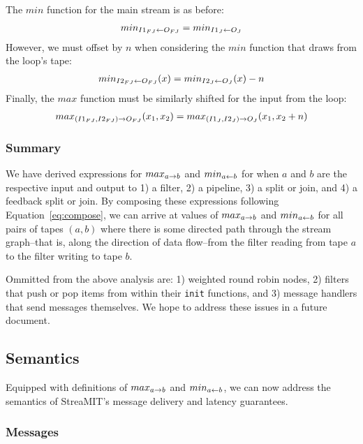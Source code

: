 The $min$ function for the main stream is as before:
\begin{align*}
min_{I1_{FJ} \leftarrow O_{FJ}} = min_{I1_J \leftarrow O_J} 
\end{align*}
However, we must offset by $n$ when considering the $min$ function
that draws from the loop's tape:
\begin{align*}
min_{I2_{FJ} \leftarrow O_{FJ}}(x) = min_{I2_J \leftarrow O_J}(x) - n
\end{align*}
Finally, the $max$ function must be similarly shifted for the input
from the loop:
\begin{align*}
max_{(I1_{FJ}, I2_{FJ}) \rightarrow O_{FJ}}(x_1, x_2) = max_{(I1_J, I2_J) \rightarrow O_J}(x_1,
x_2 + n)
\end{align*}

\subsubsection{Summary}

We have derived expressions for $max_{a \rightarrow b}$ and $min_{a \leftarrow b}$ for when
$a$ and $b$ are the respective input and output to 1) a filter, 2) a
pipeline, 3) a split or join, and 4) a feedback split or join.  By
composing these expressions following Equation~\ref{eq:compose}, we
can arrive at values of $max_{a \rightarrow b}$ and $min_{a \leftarrow b}$ for all pairs of
tapes $(a, b)$ where there is some directed path through the stream
graph--that is, along the direction of data flow--from the filter
reading from tape $a$ to the filter writing to tape $b$.  

Ommitted from the above analysis are: 1) weighted round robin nodes,
2) filters that push or pop items from within their {\tt init}
functions, and 3) message handlers that send messages themselves.  We
hope to address these issues in a future document.

\subsection{Semantics}

Equipped with definitions of $max_{a \rightarrow b}$ and $min_{a \leftarrow b}$, we can now
address the semantics of StreaMIT's message delivery and latency
guarantees.

\subsubsection{Messages}

